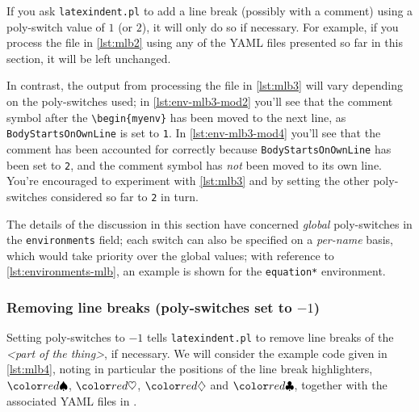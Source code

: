 	If you ask \texttt{latexindent.pl} to add a line break (possibly with a comment) using a poly-switch value of $1$ (or $2$),
	it will only do so if necessary. For example, if you process the file in \vref{lst:mlb2} using any of the YAML
	files presented so far in this section, it will be left unchanged.

	\begin{minipage}{.45\linewidth}
	\end{minipage}
	\hfill
	\begin{minipage}{.45\linewidth}
	\end{minipage}

	In contrast, the output from processing the file in \cref{lst:mlb3} will vary depending
	on the poly-switches used; in \cref{lst:env-mlb3-mod2} you'll see that the comment symbol after
	the \lstinline!\begin{myenv}! has been moved to the next line, as \texttt{BodyStartsOnOwnLine}
	is set to \texttt{1}. In \cref{lst:env-mlb3-mod4} you'll see that the comment has been accounted
	for correctly because \texttt{BodyStartsOnOwnLine} has been set to \texttt{2},
	and the comment symbol has \emph{not} been moved to its own line. You're encouraged to experiment
	with \cref{lst:mlb3} and by setting the other poly-switches considered so far to \texttt{2} in turn.

	\begin{minipage}{.45\linewidth}
	\end{minipage}
	\hfill
	\begin{minipage}{.45\linewidth}
	\end{minipage}

	The details of the discussion in this section have concerned \emph{global} poly-switches in the \texttt{environments} field;
	each switch can also be specified on a \emph{per-name} basis, which would take priority over the global values; with
	reference to \vref{lst:environments-mlb}, an example is shown for the \texttt{equation*} environment.

\subsubsection{Removing line breaks (poly-switches set to $-1$)}
	Setting poly-switches to $-1$ tells \texttt{latexindent.pl} to remove line breaks of the \emph{<part of the thing>}, if necessary. We will consider the
	example code given in \cref{lst:mlb4}, noting in particular the positions of
	the line break highlighters, $\BeginStartsOnOwnLine$, $\BodyStartsOnOwnLine$, $\EndStartsOnOwnLine$
	and $\EndFinishesWithLineBreak$, together with the associated YAML files in .

